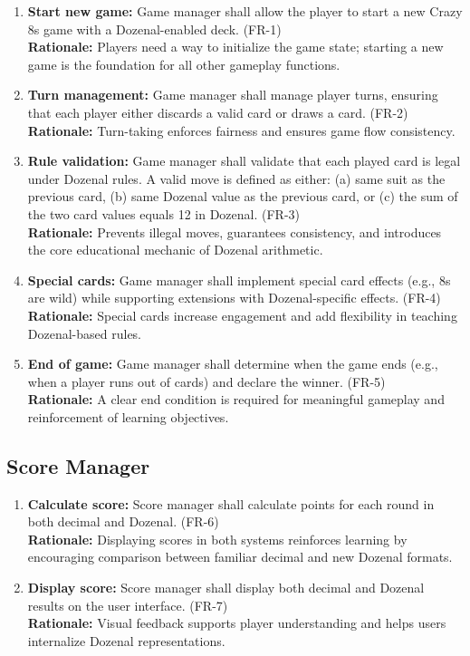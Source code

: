 \documentclass[12pt]{article}
\begin{document}
\begin{enumerate}
    \item \textbf{Start new game:} Game manager shall allow the player to start a new Crazy 8s game with a Dozenal-enabled deck. (FR-1) \\
    \textbf{Rationale:} Players need a way to initialize the game state; starting a new game is the foundation for all other gameplay functions.

    \item \textbf{Turn management:} Game manager shall manage player turns, ensuring that each player either discards a valid card or draws a card. (FR-2) \\
    \textbf{Rationale:} Turn-taking enforces fairness and ensures game flow consistency.

    \item \textbf{Rule validation:} Game manager shall validate that each played card is legal under Dozenal rules. A valid move is defined as either: (a) same suit as the previous card, (b) same Dozenal value as the previous card, or (c) the sum of the two card values equals 12 in Dozenal. (FR-3) \\
    \textbf{Rationale:} Prevents illegal moves, guarantees consistency, and introduces the core educational mechanic of Dozenal arithmetic.

    \item \textbf{Special cards:} Game manager shall implement special card effects (e.g., 8s are wild) while supporting extensions with Dozenal-specific effects. (FR-4) \\
    \textbf{Rationale:} Special cards increase engagement and add flexibility in teaching Dozenal-based rules.

    \item \textbf{End of game:} Game manager shall determine when the game ends (e.g., when a player runs out of cards) and declare the winner. (FR-5) \\
    \textbf{Rationale:} A clear end condition is required for meaningful gameplay and reinforcement of learning objectives.
\end{enumerate}


\subsection{Score Manager}

\begin{enumerate}
    \item \textbf{Calculate score:} Score manager shall calculate points for each round in both decimal and Dozenal. (FR-6) \\
    \textbf{Rationale:} Displaying scores in both systems reinforces learning by encouraging comparison between familiar decimal and new Dozenal formats.

    \item \textbf{Display score:} Score manager shall display both decimal and Dozenal results on the user interface. (FR-7) \\
    \textbf{Rationale:} Visual feedback supports player understanding and helps users internalize Dozenal representations.
\end{enumerate}
\end{document}
